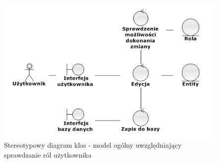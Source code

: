 \begin{adjustwidth}{4em}{0pt}
\begin{figure}[H]
    \centering
    \includegraphics[scale=0.8]{diagramy/modelKlas/Robustnessdiagram2.png}
    \caption{Stereotypowy diagram klas - model ogólny uwzględniający sprawdzanie ról użytkownika}
    \label{fig:ogolny}
\end{figure}

\end{adjustwidth}
